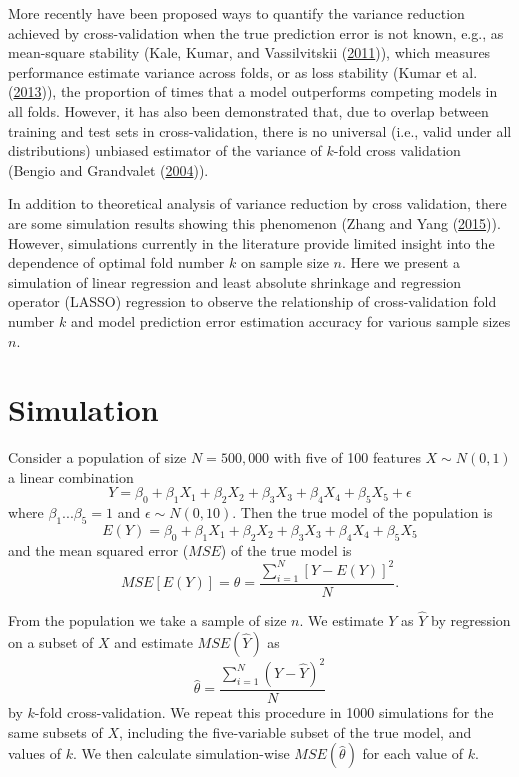 \documentclass[
  12pt,
]{article}
\begin{document}
More recently have been proposed ways to quantify the variance reduction
achieved by cross-validation when the true prediction error is not
known, e.g., as mean-square stability (Kale, Kumar, and Vassilvitskii
(\protect\hyperlink{ref-Kale2011}{2011})), which measures performance
estimate variance across folds, or as loss stability (Kumar et al.
(\protect\hyperlink{ref-Kumar2013}{2013})), the proportion of times that
a model outperforms competing models in all folds. However, it has also
been demonstrated that, due to overlap between training and test sets in
cross-validation, there is no universal (i.e., valid under all
distributions) unbiased estimator of the variance of \(k\)-fold cross
validation (Bengio and Grandvalet
(\protect\hyperlink{ref-Bengio2004}{2004})).

In addition to theoretical analysis of variance reduction by cross
validation, there are some simulation results showing this phenomenon
(Zhang and Yang (\protect\hyperlink{ref-Zhang2015}{2015})). However,
simulations currently in the literature provide limited insight into the
dependence of optimal fold number \(k\) on sample size \(n\). Here we
present a simulation of linear regression and least absolute shrinkage
and regression operator (LASSO) regression to observe the relationship
of cross-validation fold number \(k\) and model prediction error
estimation accuracy for various sample sizes \(n\).

\hypertarget{simulation}{%
\section{Simulation}\label{simulation}}

Consider a population of size \(N = 500,000\) with five of 100 features
\(X \sim N(0, 1)\) a linear combination
\[Y = \beta_0 + \beta_1X_1 + \beta_2X_2 + \beta_3X_3 + \beta_4X_4 + \beta_5X_5 + \epsilon\]
where \(\beta_1...\beta_5 = 1\) and \(\epsilon \sim N(0, 10)\). Then the
true model of the population is
\[E(Y) = \beta_0 + \beta_1X_1 + \beta_2X_2 + \beta_3X_3 + \beta_4X_4 + \beta_5X_5\]
and the mean squared error (\(MSE\)) of the true model is
\[MSE[E(Y)] = \theta = \frac{\sum_{i=1}^{N}[Y - E(Y)]^2}{N}.\]

From the population we take a sample of size \(n\). We estimate \(Y\) as
\(\hat{Y}\) by regression on a subset of \(X\) and estimate
\(MSE(\hat{Y})\) as
\[\hat{\theta} = \frac{\sum_{i=1}^{N}(Y - \hat{Y})^2}{N}\] by \(k\)-fold
cross-validation. We repeat this procedure in 1000 simulations for the
same subsets of \(X\), including the five-variable subset of the true
model, and values of \(k\). We then calculate simulation-wise
\(MSE(\hat{\theta})\) for each value of \(k\).
\end{document}
